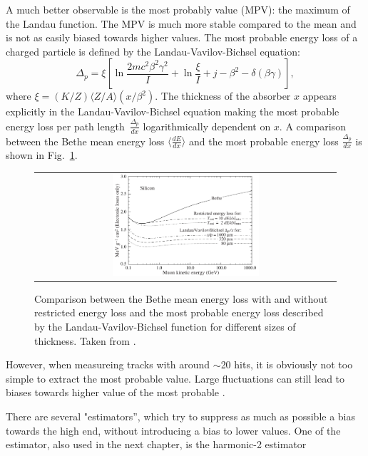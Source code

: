A much better observable is the most probably value (MPV): the maximum of the Landau function.
The MPV is much more stable compared to the mean and is not as easily biased towards higher \dedx values. 
The most probable energy loss of a charged particle is defined by the Landau-Vavilov-Bichsel equation:
\begin{equation}
\Delta_p = \xi \left[ \ln \frac{2mc^2\beta^2\gamma^2}{I}  + \ln\frac{\xi}{I} + j - \beta^2 - \delta(\beta\gamma)  \right],
\end{equation}
where $\xi=(K/Z)\langle Z/A \rangle (x/\beta^2)$. 
The thickness of the absorber $x$ appears explicitly in the Landau-Vavilov-Bichsel equation making the most probable energy loss per path \mbox{length $\frac{\Delta_p}{dx}$} logarithmically dependent on $x$.
A comparison between the Bethe mean energy loss $\langle \frac{dE}{dx} \rangle$ and the most probable energy loss $\frac{\Delta_p}{dx}$ is shown in Fig.~\ref{fig:dEdx_Bethe_Landau}.
\begin{figure}[!bt]
  \centering 
  \begin{tabular}{c}
  \includegraphics[width=0.5\textwidth]{figures/analysis/dEdx_Bethe_Landau.png}
  \end{tabular}
  \caption{Comparison between the Bethe mean energy loss with and without restricted energy loss and the most probable energy loss described by the Landau-Vavilov-Bichsel function for different sizes of thickness. 
           Taken from \cite{bib:PDG_2014}.} 
  \label{fig:dEdx_Bethe_Landau}
\end{figure}
However, when measureing tracks with around $\sim$20 hits, it is obviously not too simple to extract the most probable value. 
Large fluctuations can still lead to biases towards higher value of the most probable \dedx.

There are several "estimators'', which try to suppress as much as possible a bias towards the high end, without introducing a bias to lower values.
One of the estimator, also used in the next chapter, is the harmonic-2 estimator

